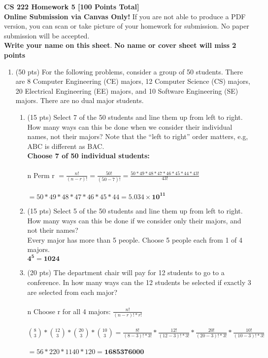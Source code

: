 \documentclass[11pt]{article}
\newcommand\tab[1][1cm]{\hspace*{#1}}
\begin{document}
{\Large {\bf CS 222 Homework 5 [100 Points Total]}}  \\

\noindent \textbf{Online Submission via Canvas Only!} If you are not able to produce a PDF version, you can scan or take picture of your homework for submission. No paper submission will be accepted.\\

\noindent \textbf{Write your name on this sheet}. \textbf{No name or cover sheet will miss 2 points}




\begin{enumerate}
  \item (50 pts) For the following problems, consider a group of 50 students. There are 8 Computer Engineering (CE) majors, 12 Computer Science (CS) majors, 20 Electrical Engineering (EE) majors, and 10 Software Engineering (SE) majors. There are no dual major students.
    \begin{enumerate}

      \item (15 pts) Select 7 of the 50 students and line them up from left to right. How many ways can this be done when we consider their individual names, not their majors? Note that the ``left to right'' order matters, e.g, ABC is different as BAC.\\
      	\tab \textbf{Choose 7 of 50 individual students:} \\\\
	\tab n Perm r $= \frac{n!}{(n-r)!} = \frac{50!}{(50-7)!} = \frac{50*49*48*47*46*45*44*43!}{43!}$ \\\\
	\tab $= 50*49*48*47*46*45*44 = \mathbf{5.034\times10^{11}}$ 
	
      \item (15 pts) Select 5 of the 50 students and line them up from left to right. How many ways can this be done if we consider only their majors, and not their names? \\
	\tab Every major has more than 5 people. Choose 5 people each from 1 of 4 majors.\\
	\tab $\mathbf{4^5 = 1024}$
     
     \item (20 pts) The department chair will pay for 12 students to go to a conference. In how many ways can the 12 students be selected if exactly 3 are selected from each major? \\\\
	\tab n Choose r for all 4 majors: $\frac{n!}{(n-r)!*r!}$ \\\\
	\tab $\binom{8}{3} * \binom{12}{3} * \binom{20}{3} * \binom{10}{3} = \frac{8!}{(8-3)!*3!}*\frac{12!}{(12-3)!*3!}*\frac{20!}{(20-3)!*3!}*\frac{10!}{(10-3)!*3!}$ \\\\
	\tab $= 56*220*1140*120 = \mathbf{1685376000}$
    

\end{enumerate}
\end{enumerate}
\end{document}
